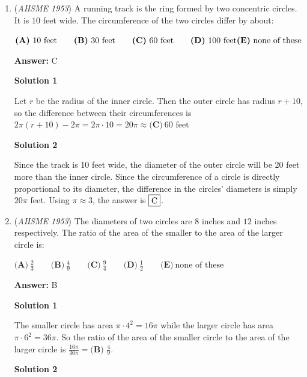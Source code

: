 \begin{enumerate}
 


 


	\item (\textit{AHSME 1953}) A running track is the ring formed by two concentric circles. It is $10$ feet wide. The circumference of the two circles differ by about: 


 $\textbf{(A)}\ 10\text{ feet} \qquad \textbf{(B)}\ 30\text{ feet} \qquad \textbf{(C)}\ 60\text{ feet} \qquad \textbf{(D)}\ 100\text{ feet}\\ \textbf{(E)}\ \text{none of these}$

 \textbf{Answer: }C



\textbf{Solution 1}

Let $r$ be the radius of the inner circle.  Then the outer circle has radius $r + 10$, so the difference between their circumferences is $2\pi(r+10) - 2\pi = 2\pi \cdot 10 = 20\pi \approx \boxed{\textbf{(C)}\ 60\text{ feet} }$




\textbf{Solution 2}

Since the track is 10 feet wide, the diameter of the outer circle will be 20 feet more than the inner circle. Since the circumference of a circle is directly proportional to its diameter, the difference in the circles' diameters is simply $20\pi$ feet. Using $\pi \approx 3$, the answer is $\fbox{C}$.

 


	\item (\textit{AHSME 1953}) The diameters of two circles are $8$ inches and $12$ inches respectively. The ratio of the area of the smaller to the area of the larger circle is: 


 $\textbf{(A)}\ \frac{2}{3} \qquad \textbf{(B)}\ \frac{4}{9} \qquad \textbf{(C)}\ \frac{9}{4} \qquad \textbf{(D)}\ \frac{1}{2}\qquad \textbf{(E)}\ \text{none of these}$

 \textbf{Answer: }B



\textbf{Solution 1}

The smaller circle has area $\pi\cdot4^2 = 16\pi$ while the larger circle has area $\pi\cdot6^2=36\pi$. So the ratio of the area of the smaller circle to the area of the larger circle is $\frac{16\pi}{36\pi}=\boxed{\textbf{(B) }\frac{4}{9}}$.

 



\textbf{Solution 2}


\end{enumerate}
